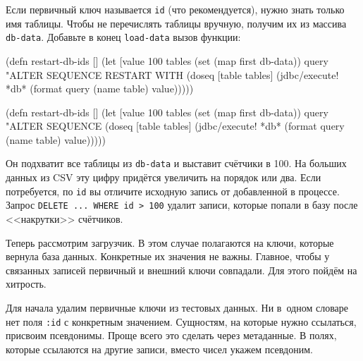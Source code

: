 \fi

Если первичный ключ называется \verb|id| (что рекомендуется), нужно знать
только имя таблицы. Чтобы не перечислять таблицы вручную, получим их из массива
\verb|db-data|. Добавьте в конец \verb|load-data| вызов функции:


\ifx\DEVICETYPE\MOBILE

\begin{english}
  \begin{clojure}
(defn restart-db-ids []
  (let [value 100
        tables (set (map first db-data))
        query "ALTER SEQUENCE %
               RESTART WITH %
    (doseq [table tables]
      (jdbc/execute! *db*
        (format query
          (name table) value)))))
  \end{clojure}
\end{english}

\else

\begin{english}
  \begin{clojure}
(defn restart-db-ids []
  (let [value 100
        tables (set (map first db-data))
        query "ALTER SEQUENCE %
    (doseq [table tables]
      (jdbc/execute! *db* (format query (name table) value)))))
  \end{clojure}
\end{english}

\fi

Он подхватит все таблицы из \verb|db-data| и выставит счётчики в 100. На
больших данных из CSV эту цифру придётся увеличить на порядок или два. Если
потребуется, по \verb|id| вы отличите исходную запись от добавленной в
процессе. Запрос \verb|DELETE ... WHERE id > 100| удалит записи, которые
попали в базу после <<накрутки>> счётчиков.

Теперь рассмотрим загрузчик. В этом случае полагаются на ключи, которые вернула
база данных. Конкретные их значения не важны. Главное, чтобы у связанных записей
первичный и внешний ключи совпадали. Для этого пойдём на хитрость.

Для начала удалим первичные ключи из тестовых данных. Ни в~одном словаре нет
поля \verb|:id| с конкретным значением. Сущностям, на которые нужно ссылаться,
присвоим псевдонимы. Проще всего это сделать через метаданные. В полях, которые
ссылаются на другие записи, вместо чисел укажем псевдоним.


\ifx\DEVICETYPE\MOBILE


